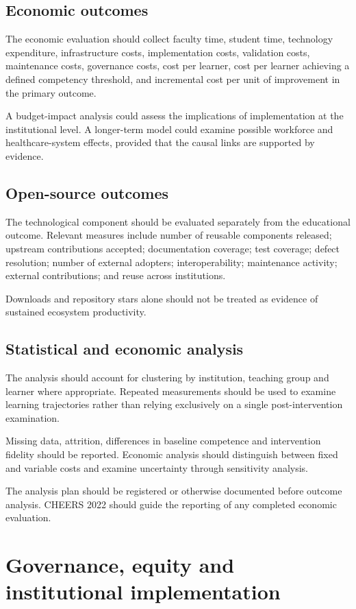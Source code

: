 \documentclass[11pt,a4paper]{article}
\begin{document}
\subsection{Economic outcomes}
The economic evaluation should collect faculty time, student time, technology expenditure, infrastructure costs, implementation costs, validation costs, maintenance costs, governance costs, cost per learner, cost per learner achieving a defined competency threshold, and incremental cost per unit of improvement in the primary outcome.

A budget-impact analysis could assess the implications of implementation at the institutional level. A longer-term model could examine possible workforce and healthcare-system effects, provided that the causal links are supported by evidence.

\subsection{Open-source outcomes}
The technological component should be evaluated separately from the educational outcome. Relevant measures include number of reusable components released; upstream contributions accepted; documentation coverage; test coverage; defect resolution; number of external adopters; interoperability; maintenance activity; external contributions; and reuse across institutions.

Downloads and repository stars alone should not be treated as evidence of sustained ecosystem productivity.

\subsection{Statistical and economic analysis}
The analysis should account for clustering by institution, teaching group and learner where appropriate. Repeated measurements should be used to examine learning trajectories rather than relying exclusively on a single post-intervention examination.

Missing data, attrition, differences in baseline competence and intervention fidelity should be reported. Economic analysis should distinguish between fixed and variable costs and examine uncertainty through sensitivity analysis.

The analysis plan should be registered or otherwise documented before outcome analysis. CHEERS 2022 should guide the reporting of any completed economic evaluation.

\section{Governance, equity and institutional implementation}
\end{document}
